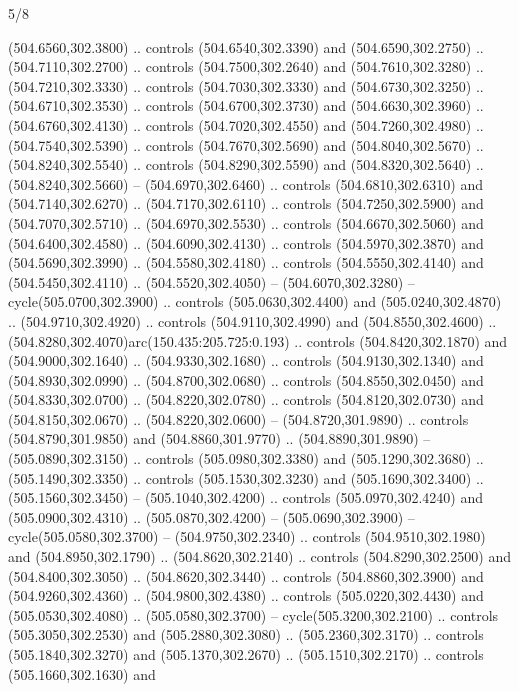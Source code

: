 \begin{flagdescription}{5/8}
\begin{scope}[xshift=0.5\flaglength,yshift=0.5\flagwidth,scale=\flagwidth/475.63]
\begin{scope}[y=0.8pt, x=0.8pt, yscale=-1, xscale=1,shift={(-450,-300)}]
\begin{scope}[cm={{1.0,0.0,0.0,1.0,(-0.0002,0.12556)}},cm={{1.0,0.0,0.0,1.0,(0.00179,0.0)}}]
\begin{scope}[cm={{1.11592,0.0,0.0,1.11592,(-106.89933,-41.77764)}}]
\begin{scope}[draw=black,fill=cfff]
\begin{scope}[fill=black]
  (504.6560,302.3800) .. controls (504.6540,302.3390) and (504.6590,302.2750) ..
  (504.7110,302.2700) .. controls (504.7500,302.2640) and (504.7610,302.3280) ..
  (504.7210,302.3330) .. controls (504.7030,302.3330) and (504.6730,302.3250) ..
  (504.6710,302.3530) .. controls (504.6700,302.3730) and (504.6630,302.3960) ..
  (504.6760,302.4130) .. controls (504.7020,302.4550) and (504.7260,302.4980) ..
  (504.7540,302.5390) .. controls (504.7670,302.5690) and (504.8040,302.5670) ..
  (504.8240,302.5540) .. controls (504.8290,302.5590) and (504.8320,302.5640) ..
  (504.8240,302.5660) -- (504.6970,302.6460) .. controls (504.6810,302.6310) and
  (504.7140,302.6270) .. (504.7170,302.6110) .. controls (504.7250,302.5900) and
  (504.7070,302.5710) .. (504.6970,302.5530) .. controls (504.6670,302.5060) and
  (504.6400,302.4580) .. (504.6090,302.4130) .. controls (504.5970,302.3870) and
  (504.5690,302.3990) .. (504.5580,302.4180) .. controls (504.5550,302.4140) and
  (504.5450,302.4110) .. (504.5520,302.4050) -- (504.6070,302.3280) --
  cycle(505.0700,302.3900) .. controls (505.0630,302.4400) and
  (505.0240,302.4870) .. (504.9710,302.4920) .. controls (504.9110,302.4990) and
  (504.8550,302.4600) .. (504.8280,302.4070)arc(150.435:205.725:0.193) ..
  controls (504.8420,302.1870) and (504.9000,302.1640) .. (504.9330,302.1680) ..
  controls (504.9130,302.1340) and (504.8930,302.0990) .. (504.8700,302.0680) ..
  controls (504.8550,302.0450) and (504.8330,302.0700) .. (504.8220,302.0780) ..
  controls (504.8120,302.0730) and (504.8150,302.0670) .. (504.8220,302.0600) --
  (504.8720,301.9890) .. controls (504.8790,301.9850) and (504.8860,301.9770) ..
  (504.8890,301.9890) -- (505.0890,302.3150) .. controls (505.0980,302.3380) and
  (505.1290,302.3680) .. (505.1490,302.3350) .. controls (505.1530,302.3230) and
  (505.1690,302.3400) .. (505.1560,302.3450) -- (505.1040,302.4200) .. controls
  (505.0970,302.4240) and (505.0900,302.4310) .. (505.0870,302.4200) --
  (505.0690,302.3900) -- cycle(505.0580,302.3700) -- (504.9750,302.2340) ..
  controls (504.9510,302.1980) and (504.8950,302.1790) .. (504.8620,302.2140) ..
  controls (504.8290,302.2500) and (504.8400,302.3050) .. (504.8620,302.3440) ..
  controls (504.8860,302.3900) and (504.9260,302.4360) .. (504.9800,302.4380) ..
  controls (505.0220,302.4430) and (505.0530,302.4080) .. (505.0580,302.3700) --
  cycle(505.3200,302.2100) .. controls (505.3050,302.2530) and
  (505.2880,302.3080) .. (505.2360,302.3170) .. controls (505.1840,302.3270) and
  (505.1370,302.2670) .. (505.1510,302.2170) .. controls (505.1660,302.1630) and

\end{scope}
\end{scope}
\end{scope}
\end{scope}
\end{scope}
\end{scope}
\end{flagdescription}
